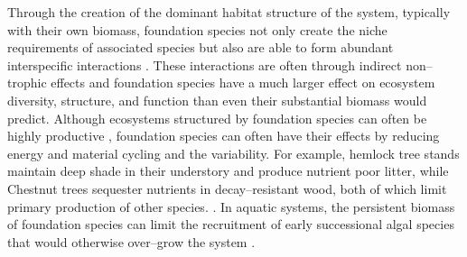\documentclass{article}
\begin{document}
Through the creation of the dominant habitat structure of the system, typically with their own biomass, foundation species not only create the niche requirements of associated species but also are able to form abundant interspecific interactions \cite{angelini_interactions_2011, ellison_foundation_2019}. These interactions are often through indirect non--trophic effects \cite{ellison_foundation_2019} and foundation species have a much larger effect on ecosystem diversity, structure, and function than even their substantial biomass would predict. Although ecosystems structured by foundation species can often be highly productive \cite{wong_evaluating_2011}, foundation species can often have their effects by reducing energy and material cycling and the variability. For example, hemlock tree stands maintain deep shade in their understory and produce nutrient poor litter, while Chestnut trees sequester nutrients in decay--resistant wood, both of which limit primary production of other species. \cite{ellison_loss_2005}. In aquatic systems, the persistent biomass of foundation species can limit the recruitment of early successional algal species that would otherwise over--grow the system \cite{fields_foundation_2022, CORAL_EXAMPLE}. %
\end{document}
